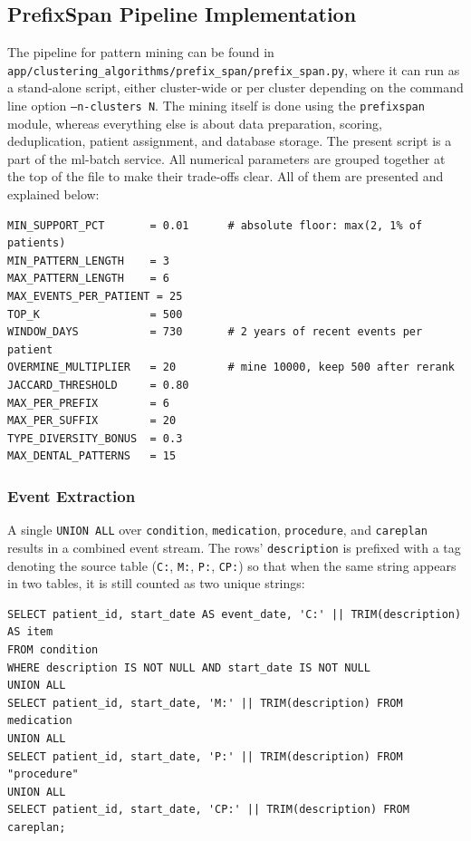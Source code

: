 \subsection{PrefixSpan Pipeline Implementation}

The pipeline for pattern mining can be found in \texttt{app/\allowbreak clustering\_\allowbreak algorithms/\allowbreak prefix\_\allowbreak span/\allowbreak prefix\_\allowbreak span.py}, where it can run as a stand-alone script, either cluster-wide or per cluster depending on the command line option \texttt{--n-clusters N}. The mining itself is done using the \texttt{prefixspan} module, whereas everything else is about data preparation, scoring, deduplication, patient assignment, and database storage. The present script is a part of the ml-batch service. All numerical parameters are grouped together at the top of the file to make their trade-offs clear. All of them are presented and explained below:

\begin{lstlisting}[style=pythonstyle]
MIN_SUPPORT_PCT       = 0.01      # absolute floor: max(2, 1% of patients)
MIN_PATTERN_LENGTH    = 3
MAX_PATTERN_LENGTH    = 6
MAX_EVENTS_PER_PATIENT = 25
TOP_K                 = 500
WINDOW_DAYS           = 730       # 2 years of recent events per patient
OVERMINE_MULTIPLIER   = 20        # mine 10000, keep 500 after rerank
JACCARD_THRESHOLD     = 0.80
MAX_PER_PREFIX        = 6
MAX_PER_SUFFIX        = 20
TYPE_DIVERSITY_BONUS  = 0.3
MAX_DENTAL_PATTERNS   = 15

\end{lstlisting}

\subsubsection*{Event Extraction}

A single \texttt{UNION ALL} over \texttt{condition}, \texttt{medication}, \texttt{procedure}, and \texttt{careplan} results in a combined event stream. The rows' \texttt{description} is prefixed with a tag denoting the source table (\texttt{C:}, \texttt{M:}, \texttt{P:}, \texttt{CP:}) so that when the same string appears in two tables, it is still counted as two unique strings:

\begin{lstlisting}[style=sqlstyle]
SELECT patient_id, start_date AS event_date, 'C:' || TRIM(description) AS item
FROM condition
WHERE description IS NOT NULL AND start_date IS NOT NULL
UNION ALL
SELECT patient_id, start_date, 'M:' || TRIM(description) FROM medication
UNION ALL
SELECT patient_id, start_date, 'P:' || TRIM(description) FROM "procedure"
UNION ALL
SELECT patient_id, start_date, 'CP:' || TRIM(description) FROM careplan;

\end{lstlisting}

